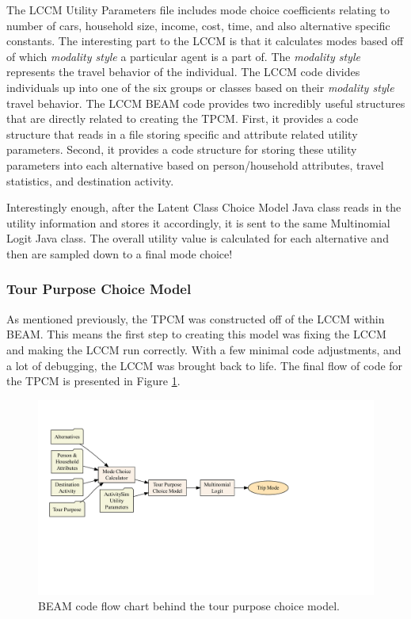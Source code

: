 \documentclass[12pt, oneside, openright]{byuthesis}
\begin{document}
The LCCM Utility Parameters file includes mode choice coefficients relating to number of cars, household size, income, cost, time, and also alternative specific constants. The interesting part to the LCCM is that it calculates modes based off of which \emph{modality style} a particular agent is a part of. The \emph{modality style} represents the travel behavior of the individual. The LCCM code divides individuals up into one of the six groups or classes based on their \emph{modality style} travel behavior. The LCCM BEAM code provides two incredibly useful structures that are directly related to creating the TPCM. First, it provides a code structure that reads in a file storing specific and attribute related utility parameters. Second, it provides a code structure for storing these utility parameters into each alternative based on person/household attributes, travel statistics, and destination activity.

Interestingly enough, after the Latent Class Choice Model Java class reads in the utility information and stores it accordingly, it is sent to the same Multinomial Logit Java class. The overall utility value is calculated for each alternative and then are sampled down to a final mode choice!

\hypertarget{tour-purpose-choice-model}{%
\subsubsection{Tour Purpose Choice Model}\label{tour-purpose-choice-model}}

As mentioned previously, the TPCM was constructed off of the LCCM within BEAM. This means the first step to creating this model was fixing the LCCM and making the LCCM run correctly. With a few minimal code adjustments, and a lot of debugging, the LCCM was brought back to life. The final flow of code for the TPCM is presented in Figure \ref{fig:tpcmflow}.

\begin{figure}

{\centering \includegraphics{thesis_files/figure-latex/tpcmflow-1} 

}

\caption{BEAM code flow chart behind the tour purpose choice model.}\label{fig:tpcmflow}
\end{figure}
\end{document}
